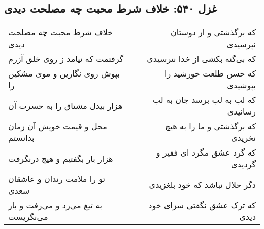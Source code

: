 \begin{center}
\section*{غزل ۵۴۰: خلاف شرط محبت چه مصلحت دیدی}
\label{sec:540}
\begin{longtable}{l p{0.5cm} r}
خلاف شرط محبت چه مصلحت دیدی
&&
که برگذشتی و از دوستان نپرسیدی
\\
گرفتمت که نیامد ز روی خلق آزرم
&&
که بی‌گنه بکشی از خدا نترسیدی
\\
بپوش روی نگارین و موی مشکین را
&&
که حسن طلعت خورشید را بپوشیدی
\\
هزار بیدل مشتاق را به حسرت آن
&&
که لب به لب برسد جان به لب رسانیدی
\\
محل و قیمت خویش آن زمان بدانستم
&&
که برگذشتی و ما را به هیچ نخریدی
\\
هزار بار بگفتیم و هیچ درنگرفت
&&
که گرد عشق مگرد ای فقیر و گردیدی
\\
تو را ملامت رندان و عاشقان سعدی
&&
دگر حلال نباشد که خود بلغزیدی
\\
به تیغ می‌زد و می‌رفت و باز می‌نگریست
&&
که ترک عشق نگفتی سزای خود دیدی
\\
\end{longtable}
\end{center}
